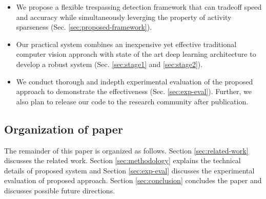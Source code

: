 \begin{itemize}
\item We propose a flexible trespassing detection framework that can tradeoff speed and accuracy while simultaneously leverging the property of activity sparseness (Sec. \ref{sec:proposed-framework}). 

\item Our practical system combines an inexpensive yet effective traditional computer vision approach with state of the art deep learning architecture to develop a robust system (Sec. \ref{sec:stage1} and \ref{sec:stage2}). 

\item We conduct thorough and indepth experimental evaluation of the proposed approach to demonstrate the effectiveness (Sec. \ref{sec:exp-eval}). Further, we also plan to release our code to the research community after publication. 
\end{itemize}

\subsection{Organization of paper}
The remainder of this paper is organized as follows.  Section \ref{sec:related-work} discusses the related work. Section \ref{sec:methodology} explains the technical details of proposed system and Section \ref{sec:exp-eval} discusses the experimental evaluation of proposed approach. Section \ref{sec:conclusion} concludes the paper and discusses possible future directions. 